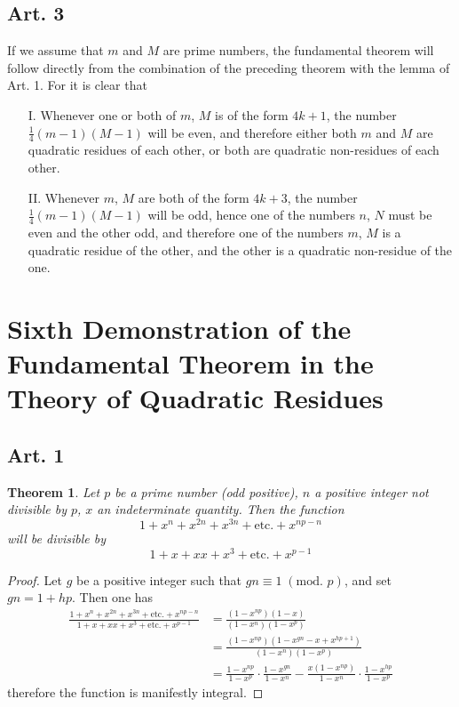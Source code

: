 \documentclass{book}
\theoremstyle{plain}
\newtheorem*{theorem}{Theorem}
\theoremstyle{remark}
\begin{document}
\subsection*{Art. 3} 

If we assume that $m$ and $M$ are prime numbers, the fundamental theorem will follow directly from the combination of the preceding theorem with the lemma of Art. 1.  For it is clear that
\begin{enumerate}
\item[I.] Whenever one or both of $m$, $M$ is of the form $4k+1$, the number $\tfrac{1}{4}(m-1)(M-1)$ will be even, and therefore either both $m$ and $M$ are quadratic residues of each other, or both are quadratic non-residues of each other.  
\item[II.] Whenever $m$, $M$ are both of the form $4k+3$, the number $\tfrac{1}{4}(m-1)(M-1)$ will be odd, hence one of the numbers $n$, $N$ must be even and the other odd, and therefore one of the numbers $m$, $M$ is a quadratic residue of the other, and the other is a quadratic non-residue of the one.
\end{enumerate}

\newpage 

\section*{Sixth Demonstration of the Fundamental Theorem in the Theory of Quadratic Residues}

\subsection*{Art. 1}

\begin{theorem} Let $p$ be a prime number (odd positive), $n$ a positive integer not divisible by $p$, $x$ an indeterminate quantity.  Then the function
\[ 1 + x^n + x^{2n} + x^{3n} + \textrm{etc.} + x^{np-n} \]
will be divisible by
\[ 1 + x + xx + x^3 + \textrm{etc.} + x^{p-1} \]
\end{theorem}
\begin{proof}
Let $g$ be a positive integer such that $gn \equiv 1 \;(\textrm{mod. }p)$, and set $gn = 1 + hp$.  Then one has
\begin{align*} \frac{1 + x^n + x^{2n} + x^{3n} + \textrm{etc.} + x^{np-n}}{1 + x + xx + x^3 + \textrm{etc.} + x^{p-1}} &= \frac{(1-x^{np})(1-x)}{(1-x^n)(1-x^p)}  \\
&= \frac{(1-x^{np})(1-x^{gn}-x+x^{hp+1})}{(1-x^n)(1-x^p)} \\
&= \frac{1-x^{np}}{1-x^p} \cdot \frac{1-x^{gn}}{1-x^n} - \frac{x(1-x^{np})}{1-x^n} \cdot \frac{1-x^{hp}}{1-x^p} \end{align*}
therefore the function is manifestly integral.
\end{proof}
\end{document}
